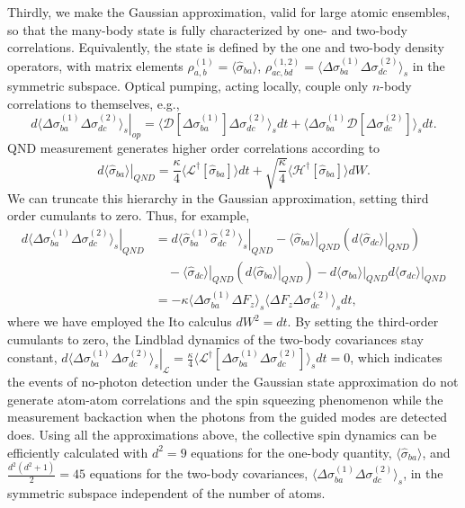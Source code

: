 \documentclass[preprint,aps,pra,onecolumn,superscriptaddress]{revtex4-1} %
\newcommand{\expect}[1]{\big\langle #1 \big\rangle}
\begin{document}
Thirdly, we make the Gaussian approximation, valid for large atomic ensembles, so that the many-body state is fully characterized by one- and two-body correlations. Equivalently, the state is defined by the one and two-body density operators, with matrix elements $\rho^{(1)}_{a, b} =\expect{\hat{\sigma}_{ba}}$, $\rho^{(1,2)}_{ac,bd}=\expect{\Delta \sigma_{ba}^{(1)}\Delta\sigma_{dc}^{(2)} }_s$ in the symmetric subspace.   Optical pumping, acting locally, couple only $n$-body correlations to themselves, e.g.,
\begin{equation}
\left.d\expect{\Delta \sigma_{ba}^{(1)}\Delta\sigma_{dc}^{(2)} }_s\right|_{op} = \expect{\mathcal{D}[\Delta \sigma_{ba}^{(1)}]\Delta\sigma_{dc}^{(2)} }_sdt + \expect{\Delta \sigma_{ba}^{(1)} \mathcal{D}[\Delta\sigma_{dc}^{(2)}] }_sdt .
\end{equation}
QND measurement generates higher order correlations according to
\begin{equation}
\left.d\expect{\hat{\sigma}_{ba}}\right|_{QND} =\frac{\kappa}{4}\expect{\mathcal{L}^\dagger\left[\hat{\sigma}_{ba} \right]}dt + \sqrt{\frac{\kappa}{4}}\expect{\mathcal{H}^\dagger\left[\hat{\sigma}_{ba} \right]}dW .
\end{equation}
We can truncate this hierarchy in the Gaussian approximation, setting third order cumulants to zero.  Thus, for example,
\begin{align}
\left.d\expect{\Delta \sigma_{ba}^{(1)} \Delta \sigma_{dc}^{(2)}}_s \right|_{QND} &= \left.d\expect{\hat{\sigma}_{ba}^{(1)} \hat{\sigma}_{dc}^{(2)}}_s \right|_{QND} - \left. \expect{\hat{\sigma}_{ba}} \right|_{QND} \left( \left.d\expect{\hat{\sigma}_{dc}} \right|_{QND}\right) \nonumber\\
&\quad - \left. \expect{\hat{\sigma}_{dc}} \right|_{QND} \left( \left.d\expect{\hat{\sigma}_{ba}} \right|_{QND}\right)
- \left.d\expect{\sigma_{ba}} \right|_{QND}\left.d\expect{\sigma_{dc}} \right|_{QND} \nonumber \\
&= -\kappa\expect{\Delta \sigma^{(1)}_{ba}  \Delta F_z }_s \expect{\Delta F_z \Delta \sigma_{dc}^{(2)} }_sdt,
\end{align}
where we have employed the Ito calculus $dW^2 = dt$.
By setting the third-order cumulants to zero, the Lindblad dynamics of the two-body covariances stay constant, $ \left.d\expect{\Delta \sigma_{ba}^{(1)} \Delta \sigma_{dc}^{(2)}}_s\right|_\mathcal{L} =\frac{\kappa}{4}\expect{\mathcal{L}^\dagger\left[\Delta\sigma_{ba}^{(1)}\Delta\sigma_{dc}^{(2)} \right]}_sdt=0 $, which indicates the events of no-photon detection under the Gaussian state approximation do not generate atom-atom correlations and the spin squeezing phenomenon while the measurement backaction when the photons from the guided modes are detected does. Using all the approximations above, the collective spin dynamics can be efficiently calculated with $ d^2=9 $ equations for the one-body quantity, $ \expect{\hat{\sigma}_{ba}} $, and $ \frac{d^2(d^2+1)}{2}=45 $ equations for the two-body covariances, $ \expect{\Delta \sigma_{ba}^{(1)}\Delta\sigma_{dc}^{(2)} }_s $, in the symmetric subspace independent of the number of atoms.
\end{document}
